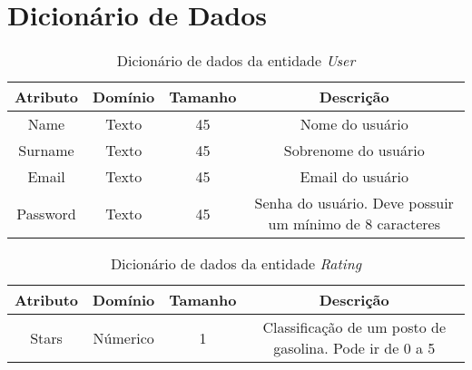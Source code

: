 \chapter{Dicionário de Dados}
\label{chap:dicionario}

\begin{table}[h]
\centering
\caption{Dicionário de dados da entidade \textit{User}}
\label{dic:user}
\begin{tabular}{cccc}
\toprule
\textbf{Atributo} & \textbf{Domínio} & \textbf{Tamanho} & \textbf{Descrição} \\
\midrule
Name                            & Texto                          & 45                             & Nome do usuário \\
Surname                         & Texto                          & 45                             & Sobrenome do usuário\\
Email                           & Texto                          & 45                             & Email do usuário\\
Password                        & Texto                          & 45                             & Senha do usuário. Deve possuir um mínimo de 8 caracteres\\
\bottomrule
\end{tabular}
\end{table}

\begin{table}[h]
\centering
\caption{Dicionário de dados da entidade \textit{Rating}}
\label{dic:rating}
\begin{tabular}{cccc}
\toprule
\textbf{Atributo} & \textbf{Domínio} & \textbf{Tamanho} & \textbf{Descrição} \\
\midrule
Stars                           & Númerico                       &1                               & Classificação de um posto de gasolina. Pode ir de 0 a 5\\
\bottomrule
\end{tabular}
\end{table}

